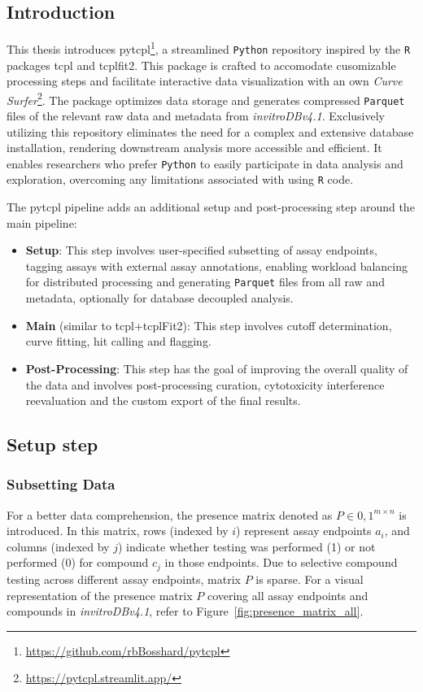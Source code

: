 \subsection{Introduction} 
This thesis introduces pytcpl\footnote{\url{https://github.com/rbBosshard/pytcpl}}, a streamlined \texttt{Python} repository inspired by the \texttt{R} packages tcpl and {tcplfit2}. This package is crafted to accomodate cusomizable processing steps and facilitate interactive data visualization with an own \emph{Curve Surfer}\footnote{\url{https://pytcpl.streamlit.app/}}. The package optimizes data storage and generates compressed \texttt{Parquet} files of the relevant raw data and metadata from \emph{invitroDBv4.1}. Exclusively utilizing this repository eliminates the need for a complex and extensive database installation, rendering downstream analysis more accessible and efficient. It enables researchers who prefer \texttt{Python} to easily participate in data analysis and exploration, overcoming any limitations associated with using \texttt{R} code.

The pytcpl pipeline adds an additional setup and post-processing step around the main pipeline:
\begin{itemize}
    \item \textbf{Setup}: This step involves user-specified subsetting of assay endpoints, tagging assays with external assay annotations, enabling workload balancing for distributed processing and generating \texttt{Parquet} files from all raw and metadata, optionally for database decoupled analysis.
    \item \textbf{Main} (similar to tcpl+tcplFit2): This step involves cutoff determination, curve fitting, hit calling and flagging.
    \item \textbf{Post-Processing}: This step has the goal of improving the overall quality of the data and involves post-processing curation, cytotoxicity interference reevaluation and the custom export of the final results.
\end{itemize}

\subsection{Setup step}\label{sec:subset_data}
\subsubsection{Subsetting Data}
For a better data comprehension, the presence matrix denoted as $P \in {{0, 1}}^{m \times n}$ is introduced. In this matrix, rows (indexed by $i$) represent assay endpoints $a_i$, and columns (indexed by $j$) indicate whether testing was performed (1) or not performed (0) for compound $c_j$ in those endpoints. Due to selective compound testing across different assay endpoints, matrix $P$ is sparse. For a visual representation of the presence matrix $P$ covering all assay endpoints and compounds in \textit{invitroDBv4.1}, refer to Figure~\ref{fig:presence_matrix_all}.

